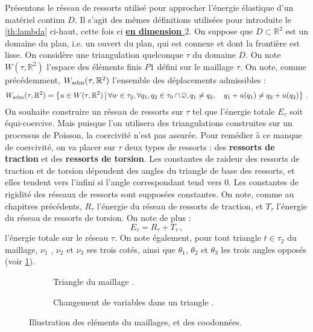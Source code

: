 Présentons le réseau de ressorts utilisé pour approcher l’énergie élastique d’un matériel continu $D$. Il s'agit des mêmes définitions utilisées pour introduite le \cref{th:lambda} ci-haut, cette fois ci \underline{\textbf{en dimension $2$}}. On suppose que $D \subset \mathbb{R}^2$ est un domaine du plan, i.e. un ouvert du plan, qui est connexe et dont la frontière est lisse. On considère une triangulation quelconque $\tau$ du domaine $D$. On note $W (\tau, \mathbb{R}^2)$ l’espace des éléments finis $P1$ défini sur le maillage $\tau$. On note, comme précédemment, $ W_{\text{\upshape adm}}(\tau, \mathbb{R}^2)$ l’ensemble des déplacements admissibles :
$$
W_{\text{\upshape adm}}(\tau, \mathbb{R}^2) =  \left\{ u\in W(\tau, \mathbb{R}^2) \, \big| \, \forall w \in \tau_2, \forall q_1, q_2 \in \tau_0 \cap \overline{\omega}, q_1 \neq q_2, \quad q_1 + u(q_1) \neq q_2 + u(q_2)  \right\} \,.
$$
On souhaite construire un réseau de ressorts sur $\tau$ tel que l’énergie totale $E_\tau$ soit équi-coercive. Mais puisque l’on utilisera des triangulations construites sur un processus de Poisson, la coercivité n'est pas assurée. Pour remédier à ce manque de coercivité, on va placer sur $\tau$ deux types de ressorts : des \textbf{ressorts de traction} et des \textbf{ressorts de torsion}. Les constantes de raideur des ressorts de traction et de torsion dépendent des angles du triangle de base des ressorts, et elles tendent vers l’infini si l’angle correspondant tend vers $0$. Les constantes de rigidité des réseaux de ressorts sont supposées constantes. On note, comme au chapitres précédents, $R_\tau$ l’énergie du réseau de ressorts de traction, et $T_\tau$ l’énergie du
réseau de ressorts de torsion. On note de plus :
$$ E_\tau = R_\tau + T_\tau \,, $$
l’énergie totale sur le réseau $\tau$. On note également, pour tout triangle $t \in \tau_2$ du maillage, $\nu_1$ , $\nu_2$ et $\nu_3$ ses trois cotés, ainsi que $\theta_1$, $\theta_2$ et $\theta_3$ les trois angles opposés (voir \cref{fig:triangle}).

\begin{figure}[!h]
    \begin{subfigure}{0.45\textwidth}
        \centering
        \caption{Triangle du maillage \parencite[p.184]{balasoiu2020halthesis}.}
        \label{fig:triangle}
    \end{subfigure}
    \begin{subfigure}{0.3\textwidth}
        \centering
        \caption{Changement de variables dans un triangle \parencite[p.184]{balasoiu2020halthesis}.}
        \label{fig:changement}
    \end{subfigure}
    \caption{Illustration des eléments du maillages, et des coodonnées.}
\end{figure}

